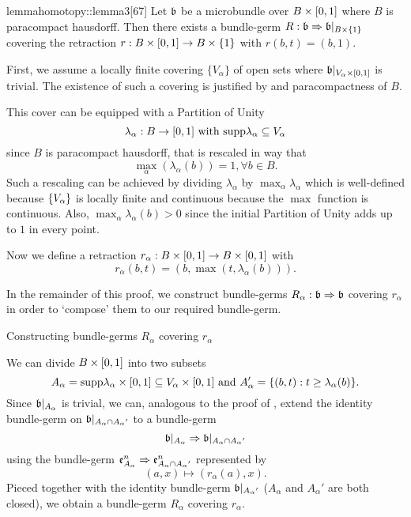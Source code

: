 \begin{scope} \newcommand{\A} { A_\alpha{} }

\begin{mystatement}{lemma}{homotopy::lemma3}[67] Let $\bb$ be a microbundle over $B \times{} [0, 1]$ where $B$ is paracompact hausdorff. Then there exists a bundle-germ $\germdef{R}{\bb}{\bb[\cylup{B}]}$ covering the retraction $r: B \times{} [0, 1] \to B \times{} \{1\}$ with $r(b, t) = (b, 1)$. \end{mystatement}

\begin{myproof} First, we assume a locally finite covering $\{V_\alpha\}$ of open sets where $\bb[\cyl{V_\alpha}]$ is trivial. The existence of such a covering is justified by  and paracompactness of $B$.

This cover can be equipped with a Partition of Unity \[ \lambda_\alpha: B \to [0, 1] \text{ with } \text{supp} \lambda_\alpha \subseteq{} V_\alpha \] since $B$ is paracompact hausdorff, that is rescaled in way that \[ \max_\alpha(\lambda_\alpha(b)) = 1, \forall b \in B. \] Such a rescaling can be achieved by dividing $\lambda_\alpha$ by $\max_\alpha \lambda_\alpha$ which is well-defined because $\{V_\alpha\}$ is locally finite and continuous because the $\max$ function is continuous. Also, $\max_\alpha \lambda_\alpha(b) > 0$ since the initial Partition of Unity adds up to $1$ in every point.

Now we define a retraction $r_\alpha: B \times{} [0, 1] \to B \times{} [0, 1]$ with \[ r_\alpha(b, t) = (b, \max(t, \lambda_\alpha(b))). \]

In the remainder of this proof, we construct bundle-germs $\germdef{R_\alpha}{\bb}{\bb}$ covering $r_\alpha$ in order to `compose' them to our required bundle-germ. \begin{sectionize} \item Constructing bundle-germs $R_\alpha$ covering $r_\alpha$

We can divide $B \times [0, 1]$ into two subsets \[ A_\alpha = \text{supp}{\lambda_\alpha} \times{} [0, 1] \subseteq{} V_\alpha \times{} [0, 1] \text{ and } A'_\alpha = \{(b, t):t \ge \lambda_\alpha(b)\}. \] Since $\bb[A_\alpha]$ is trivial, we can, analogous to the proof of , extend the identity bundle-germ on $\bb[\A \cap \A']$ to a bundle-germ \[ \germ{\bb[\A]}{\bb[\A \cap \A']} \] using the bundle-germ $\germ{\be{\A}}{\be{\A \cap \A'}}$ represented by \[ (a, x) \mapsto (r_\alpha(a), x). \] Pieced together with the identity bundle-germ $\bb[\A']$ ($\A$ and $\A'$ are both closed), we obtain a bundle-germ $R_\alpha$ covering $r_\alpha$.


\end{sectionize}
\end{myproof}
\end{scope}
